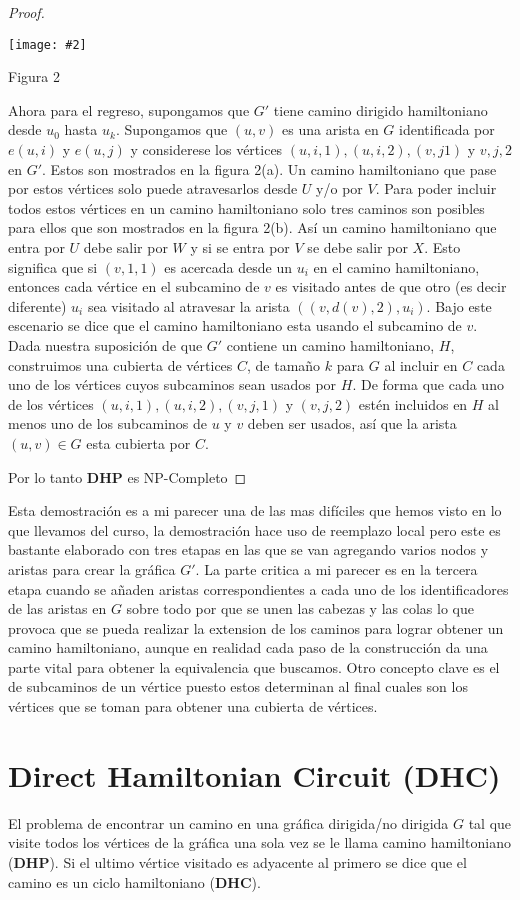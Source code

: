 \documentclass{article}
\newcommand{\jcimage}[2]{\begin{center}\texttt{[image: \#2]}\end{center}\vskip10pt}
\begin{document}
\begin{proof}
  \jcimage{0.7}{figura2-dhp.jpg}{Figura 2}

  Ahora para el regreso, supongamos que $G'$ tiene camino dirigido hamiltoniano desde $u_0$ hasta $u_k$. Supongamos que $(u,v)$ es una arista en $G$ identificada por $e(u,i)$ y $e(u,j)$ y considerese los vértices $(u,i,1),(u,i,2),(v,j1)$ y $v,j,2$ en $G'$. Estos son mostrados en la figura 2(a). Un camino hamiltoniano que pase por estos vértices solo puede atravesarlos desde $U$ y/o por $V$. Para poder incluir todos estos vértices en un camino hamiltoniano solo tres caminos son posibles para ellos que son mostrados en la figura 2(b). Así un camino hamiltoniano que entra por $U$ debe salir por $W$ y si se entra por $V$ se debe salir por $X$. Esto significa que si $(v,1,1)$ es acercada desde un $u_i$ en el camino hamiltoniano, entonces cada vértice en el subcamino de $v$ es visitado antes de que otro (es decir diferente) $u_i$ sea visitado al atravesar la arista $((v,d(v),2), u_i)$. Bajo este escenario se dice que el camino hamiltoniano esta usando el subcamino de $v$. Dada nuestra suposición de que $G'$ contiene un camino hamiltoniano, $H$, construimos una cubierta de vértices $C$, de tamaño $k$ para $G$ al incluir en $C$ cada uno de los vértices cuyos subcaminos sean usados por $H$. De forma que cada uno de los vértices $(u,i,1),(u,i,2),(v,j,1)$ y $(v,j,2)$ estén incluidos en $H$ al menos uno de los subcaminos de $u$ y $v$ deben ser usados, así que la arista $(u,v) \in G$  esta cubierta por $C$.

  Por lo tanto \textbf{DHP} es NP-Completo
\end{proof}

Esta demostración es a mi parecer una de las mas difíciles que hemos visto en lo que llevamos del curso, la demostración hace uso de reemplazo local pero este es bastante elaborado con tres etapas en las que se van agregando varios nodos y aristas para crear la gráfica $G'$. La parte critica a mi parecer es en la tercera etapa cuando se añaden aristas correspondientes a cada uno de los identificadores de las aristas en $G$ sobre todo por que se unen las cabezas y las colas lo que provoca que se pueda realizar la extension de los caminos para lograr obtener un camino hamiltoniano, aunque en realidad cada paso de la construcción da una parte vital para obtener la equivalencia que buscamos. Otro concepto clave es el de subcaminos de un vértice puesto estos determinan al final cuales son los vértices que se toman para obtener una cubierta de vértices.

\section{Direct Hamiltonian Circuit (DHC)}
El problema de encontrar un camino en una gráfica dirigida/no dirigida $G$ tal que visite todos los vértices de la gráfica una sola vez se le llama camino hamiltoniano (\textbf{DHP}). Si el ultimo vértice visitado es adyacente al primero se dice que el camino es un ciclo hamiltoniano (\textbf{DHC}).
\end{document}
